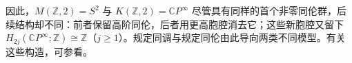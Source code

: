 因此，\(M(\mathbb Z,2)=S^2\) 与 \(K(\mathbb Z,2)=\mathbb CP^\infty\) 尽管具有同样的首个非零同伦群，后续结构却不同：前者保留高阶同伦，后者用更高胞腔消去它；这些新胞腔又留下 \(H_{2j}(\mathbb CP^\infty;\mathbb Z)\cong\mathbb Z\)（\(j\ge1\)）。规定同调与规定同伦由此导向两类不同模型。有关这些构造，可参看\cite[第4.2节，Eilenberg–MacLane Spaces 与 The Hurewicz Theorem]{Hatcher2002}。
